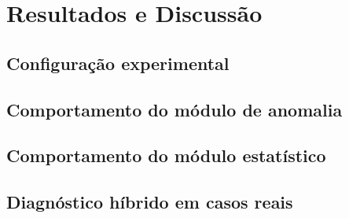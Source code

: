 \chapter{Resultados e Discussão}
\label{cap:resultados}

%


\section{Configuração experimental}
\label{sec:config_experimental}



\section{Comportamento do módulo de anomalia}
\label{sec:resultados_eq}



\section{Comportamento do módulo estatístico}
\label{sec:resultados_mp}



\section{Diagnóstico híbrido em casos reais}
\label{sec:resultados_hibrido}

